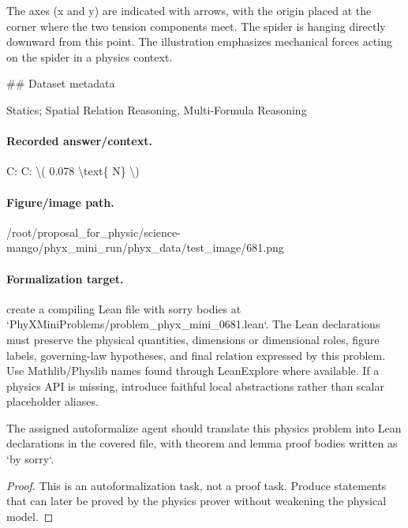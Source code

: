 The axes (x and y) are indicated with arrows, with the origin placed at the corner where the two tension components meet. The spider is hanging directly downward from this point. The illustration emphasizes mechanical forces acting on the spider in a physics context.

\#\# Dataset metadata

Statics; Spatial Relation Reasoning, Multi-Formula Reasoning

\paragraph{Recorded answer/context.}
C: C: \textbackslash{}( 0.078 \textbackslash{}text\{ N\} \textbackslash{})

\paragraph{Figure/image path.}
/root/proposal\_for\_physic/science-mango/phyx\_mini\_run/phyx\_data/test\_image/681.png

\paragraph{Formalization target.}
create a compiling Lean file with sorry bodies at `PhyXMiniProblems/problem\_phyx\_mini\_0681.lean`. The Lean declarations must preserve the physical quantities, dimensions or dimensional roles, figure labels, governing-law hypotheses, and final relation expressed by this problem.
Use Mathlib/Physlib names found through LeanExplore where available. If a physics API is missing, introduce faithful local abstractions rather than scalar placeholder aliases.

\begin{theorem}
\label{thm:physics:phyx_mini_0681:target}
The assigned autoformalize agent should translate this physics problem into Lean declarations in the covered file, with theorem and lemma proof bodies written as `by sorry`.
\end{theorem}
\begin{proof}
This is an autoformalization task, not a proof task. Produce statements that can later be proved by the physics prover without weakening the physical model.
\end{proof}

